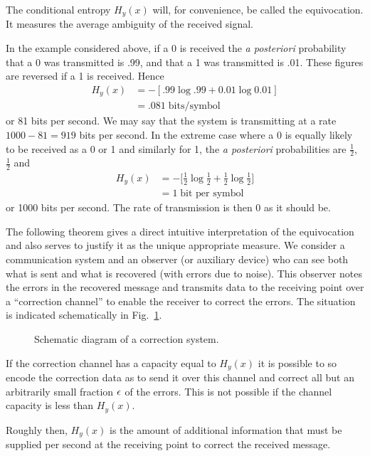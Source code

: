 The conditional entropy $H_y(x)$ will, for convenience, be called the
equivocation.  It measures the average ambiguity of the received signal.

In the example considered above, if a 0 is received the \emph{a posteriori}
probability that a 0 was transmitted is .99, and that a 1 was transmitted
is .01.  These figures are reversed if a 1 is received.
Hence
\begin{align*}
H_y(x) &= - [.99 \log .99 + 0.01 \log 0.01 ] \\
&= .081\; \text{bits/symbol}
\end{align*}
or 81 bits per second.  We may say that the system is transmitting at
a rate $1000 - 81 = 919$ bits per second.  In the extreme case where
a 0 is equally likely to be received as a 0 or 1 and similarly for 1,
the \emph{a posteriori} probabilities are $\frac12$, $\frac12$ and
\begin{align*}
H_y(x) &= - \bigl[\tfrac12\log\tfrac12+\tfrac12\log\tfrac12\bigr] \\
&= 1 \;\text{bit per symbol}
\end{align*}
or 1000 bits per second.  The rate of transmission is then 0 as it
should be.

The following theorem gives a direct intuitive interpretation of the
equivocation and also serves to justify it as the unique appropriate
measure.  We consider a communication system and an observer (or auxiliary
device) who can see both what is sent and what is recovered (with errors
due to noise).  This observer notes the errors in the recovered message
and transmits data to the receiving point over a ``correction channel''
to enable the receiver to correct the errors.  The situation is indicated
schematically in Fig.~\ref{fig:8}.
\begin{figure}[ht]
\centerline{}
\caption{Schematic diagram of a correction system.}
\label{fig:8}
\end{figure}

\begin{theorem}
\label{thm:10}
If the correction channel has a capacity equal to $H_y(x)$ it is possible
to so encode the correction data as to send it over this channel and
correct all but an arbitrarily small fraction $\epsilon$ of the errors.
This is not possible if the channel capacity is less than $H_y(x)$.
\end{theorem}

Roughly then, $H_y(x)$ is the amount of additional information that must
be supplied per second at the receiving point to correct the received
message.

